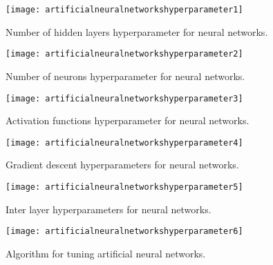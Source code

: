  	\begin{figure}[htb]
		\centering
		\texttt{[image: artificialneuralnetworkshyperparameter1]}
		\caption[Number of hidden layers hyperparameter for neural networks]{Number of hidden layers hyperparameter for neural networks.}
		\label{fig:artificialneuralnetworkshyperparameter1}
	\end{figure}
 	\begin{figure}[htb]
		\centering
		\texttt{[image: artificialneuralnetworkshyperparameter2]}
		\caption[Number of neurons hyperparameter for neural networks]{Number of neurons hyperparameter for neural networks.}
		\label{fig:artificialneuralnetworkshyperparameter2}
	\end{figure}
 	\begin{figure}[htb]
		\centering
		\texttt{[image: artificialneuralnetworkshyperparameter3]}
		\caption[Activation functions hyperparameter for neural networks]{Activation functions hyperparameter for neural networks.}
		\label{fig:artificialneuralnetworkshyperparameter3}
	\end{figure}
 	\begin{figure}[htb]
		\centering
		\texttt{[image: artificialneuralnetworkshyperparameter4]}
		\caption[Gradient descent hyperparameters for neural networks]{Gradient descent hyperparameters for neural networks.}
		\label{fig:artificialneuralnetworkshyperparameter4}
	\end{figure}
 	\begin{figure}[htb]
		\centering
		\texttt{[image: artificialneuralnetworkshyperparameter5]}
		\caption[Inter layer hyperparameters for neural networks]{Inter layer hyperparameters for neural networks.}
		\label{fig:artificialneuralnetworkshyperparameter5}
	\end{figure}
 	\begin{figure}[htb]
		\centering
		\texttt{[image: artificialneuralnetworkshyperparameter6]}
		\caption[Algorithm for tuning artificial neural networks]{Algorithm for tuning artificial neural networks.}
		\label{fig:artificialneuralnetworkshyperparameter6}
	\end{figure}
